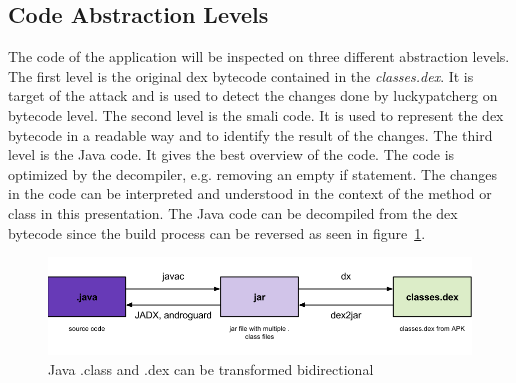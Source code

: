 \subsection{Code Abstraction Levels}
The code of the application will be inspected on three different abstraction levels.
\newline
The first level is the original dex bytecode contained in the \textit{classes.dex}.
It is target of the attack and is used to detect the changes done by \gls{luckypatcherg} on bytecode level.
\newline
The second level is the smali code.
It is used to represent the dex bytecode in a readable way and to identify the result of the changes.
\newline
The third level is the Java code.
It gives the best overview of the code.
The code is optimized by the decompiler, e.g. removing an empty if statement.
The changes in the code can be interpreted and understood in the context of the method or class in this presentation.
\newline
The Java code can be decompiled from the dex bytecode since the build process can be reversed as seen in figure~\ref{fig:re1}.
\newline
\begin{figure}[h]
    \centering
    \includegraphics[width=1\textwidth]{data/re1.png}
    \caption{Java .class and .dex can be transformed bidirectional \cite{andevconDalvikART}}
    \label{fig:re1}
\end{figure}
